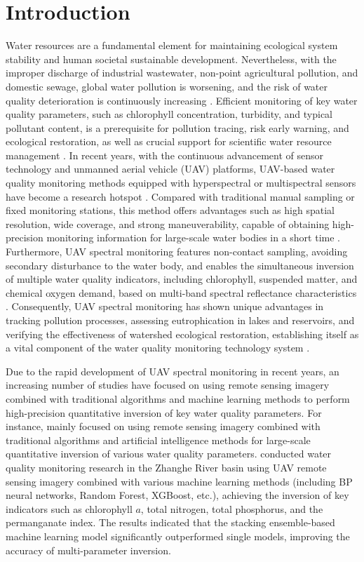 \documentclass[final,3p,times,numbers]{elsarticle}
\begin{document}
\section{Introduction}
Water resources are a fundamental element for maintaining ecological system stability and human societal sustainable development. Nevertheless, with the improper discharge of industrial wastewater, non-point agricultural pollution, and domestic sewage, global water pollution is worsening, and the risk of water quality deterioration is continuously increasing \cite{ref:1,ref:2,ref:3,ref:4}. Efficient monitoring of key water quality parameters, such as chlorophyll concentration, turbidity, and typical pollutant content, is a prerequisite for pollution tracing, risk early warning, and ecological restoration, as well as crucial support for scientific water resource management \cite{ref:5,ref:6,ref:7}. In recent years, with the continuous advancement of sensor technology and unmanned aerial vehicle (UAV) platforms, UAV-based water quality monitoring methods equipped with hyperspectral or multispectral sensors have become a research hotspot \cite{ref:8,ref:9,ref:10}. Compared with traditional manual sampling or fixed monitoring stations, this method offers advantages such as high spatial resolution, wide coverage, and strong maneuverability, capable of obtaining high-precision monitoring information for large-scale water bodies in a short time \cite{ref:11,ref:12,ref:13}. Furthermore, UAV spectral monitoring features non-contact sampling, avoiding secondary disturbance to the water body, and enables the simultaneous inversion of multiple water quality indicators, including chlorophyll, suspended matter, and chemical oxygen demand, based on multi-band spectral reflectance characteristics \cite{ref:14,ref:15,ref:16}. Consequently, UAV spectral monitoring has shown unique advantages in tracking pollution processes, assessing eutrophication in lakes and reservoirs, and verifying the effectiveness of watershed ecological restoration, establishing itself as a vital component of the water quality monitoring technology system \cite{ref:17,ref:18,ref:19}.

Due to the rapid development of UAV spectral monitoring in recent years, an increasing number of studies have focused on using remote sensing imagery combined with traditional algorithms and machine learning methods to perform high-precision quantitative inversion of key water quality parameters. For instance, \cite{ref:20} mainly focused on using remote sensing imagery combined with traditional algorithms and artificial intelligence methods for large-scale quantitative inversion of various water quality parameters. \cite{ref:23} conducted water quality monitoring research in the Zhanghe River basin using UAV remote sensing imagery combined with various machine learning methods (including BP neural networks, Random Forest, XGBoost, etc.), achieving the inversion of key indicators such as chlorophyll $a$, total nitrogen, total phosphorus, and the permanganate index. The results indicated that the stacking ensemble-based machine learning model significantly outperformed single models, improving the accuracy of multi-parameter inversion.
\end{document}
